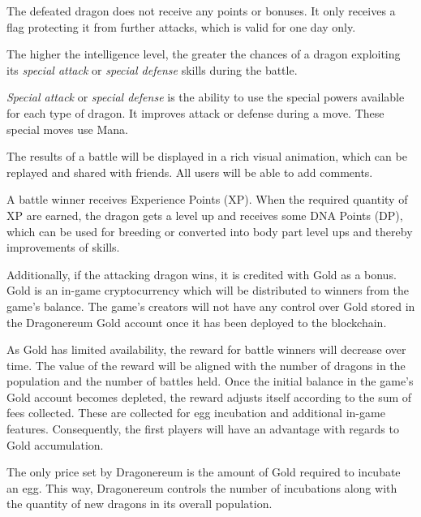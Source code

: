 \documentclass[12pt]{article}
\begin{document}
The defeated dragon does not receive any points or bonuses. It only receives a flag protecting it from further attacks, which is valid for one day only.\par

The higher the intelligence level, the greater the chances of a dragon exploiting its \textit{special attack} or \textit{special defense} skills during the battle.\par

\textit{Special attack} or \textit{special defense} is the ability to use the special powers available for each type of dragon. It improves attack or defense during a move. These special moves use Mana.\par

The results of a battle will be displayed in a rich visual animation, which can be replayed and shared with friends. All users will be able to add comments.\par

A battle winner receives Experience Points (XP). When the required quantity of XP are earned, the dragon gets a level up and receives some DNA Points (DP), which can be used for breeding or converted into body part level ups and thereby improvements of skills. \par

Additionally, if the attacking dragon wins, it is credited with Gold as a bonus. Gold is an in-game cryptocurrency which will be distributed to winners from the game’s balance. The game’s creators will not have any control over Gold stored in the Dragonereum Gold account once it has been deployed to the blockchain. \par

As Gold has limited availability, the reward for battle winners will decrease over time. The value of the reward will be aligned with the number of dragons in the population and the number of battles held. Once the initial balance in the game's Gold account becomes depleted, the reward adjusts itself according to the sum of fees collected. These are collected for egg incubation and additional in-game features. Consequently, the first players will have an advantage with regards to Gold accumulation.\par

The only price set by Dragonereum is the amount of Gold required to incubate an egg. This way, Dragonereum controls the number of incubations along with the quantity of new dragons in its overall population.\par
\end{document}
